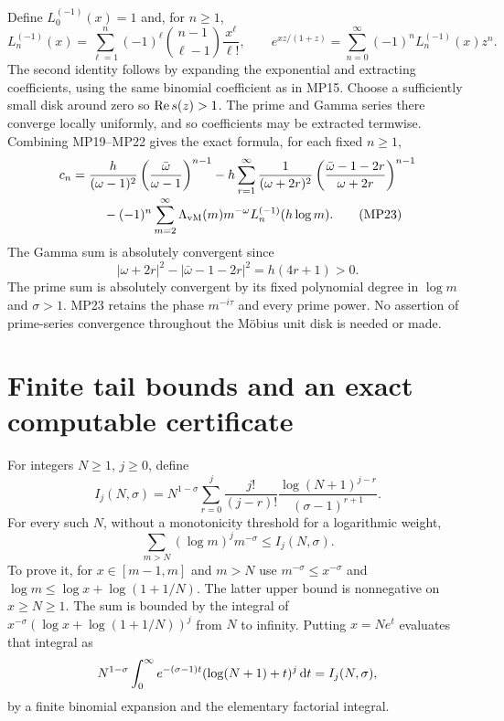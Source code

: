 Define $L_0^{(-1)}(x)=1$ and, for $n\geq1$,
\begin{equation}
 L_n^{(-1)}(x)=\sum_{\ell=1}^n(-1)^\ell
             \binom{n-1}{\ell-1}\frac{x^\ell}{\ell!},\qquad
 e^{xz/(1+z)}=\sum_{n=0}^\infty(-1)^nL_n^{(-1)}(x)z^n.
 \tag{MP22}
\end{equation}
The second identity follows by expanding the exponential and extracting
coefficients, using the same binomial coefficient as in MP15.
Choose a sufficiently small disk around zero so $\operatorname{Re} s(z)>1$.
The prime and Gamma series there converge locally uniformly, and so
coefficients may be extracted termwise. Combining MP19--MP22 gives the
exact formula, for each fixed $n\geq1$,
\begin{align}
 c_n={}&\frac h{(\omega-1)^2}
                \left(\frac{\bar\omega}{\omega-1}\right)^{n-1}
 -h\sum_{r=1}^\infty\frac1{(\omega+2r)^2}
             \left(\frac{\bar\omega-1-2r}{\omega+2r}\right)^{n-1}
 \notag\\[-2pt]
 &\hspace{4mm}-(-1)^n\sum_{m=2}^\infty
           \Lambda_{\mathrm{vM}}(m)m^{-\omega}L_n^{(-1)}(h\log m).
 \tag{MP23}
\end{align}
The Gamma sum is absolutely convergent since
\begin{equation}
 |\omega+2r|^2-|\bar\omega-1-2r|^2=h(4r+1)>0.
 \tag{MP24}
\end{equation}
The prime sum is absolutely convergent by its fixed polynomial degree in
$\log m$ and $\sigma>1$. MP23 retains the phase $m^{-i\tau}$ and
every prime power. No assertion of prime-series convergence throughout
the Möbius unit disk is needed or made.

\section{Finite tail bounds and an exact computable certificate}
For integers $N\geq1$, $j\geq0$, define
\begin{equation}
 I_j(N,\sigma)=N^{1-\sigma}\sum_{r=0}^j
       \frac{j!}{(j-r)!}\frac{\log(N+1)^{j-r}}{(\sigma-1)^{r+1}}.
 \tag{MP25}
\end{equation}
For every such $N$, without a monotonicity threshold for a logarithmic
weight,
\begin{equation}
 \sum_{m>N}(\log m)^j m^{-\sigma}\leq I_j(N,\sigma).
 \tag{MP26}
\end{equation}
To prove it, for $x\in[m-1,m]$ and $m>N$ use
$m^{-\sigma}\leq x^{-\sigma}$ and
$\log m\leq\log x+\log(1+1/N)$. The latter upper bound is
nonnegative on $x\geq N\geq1$. The sum is bounded by the integral of
$x^{-\sigma}(\log x+\log(1+1/N))^j$ from $N$ to infinity.
Putting $x=Ne^t$ evaluates that integral as
\[
 N^{1-\sigma}\int_0^\infty e^{-(\sigma-1)t}
                     (\log(N+1)+t)^j\,\mathrm d t=I_j(N,\sigma),
\]
by a finite binomial expansion and the elementary factorial integral.

